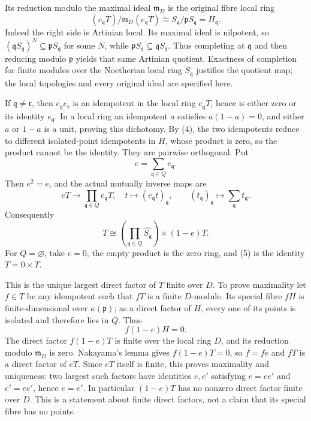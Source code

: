 Its reduction modulo the maximal ideal \(\mathfrak m_D\) is the original fibre local ring \[
 (e_{\mathfrak q}T)/\mathfrak m_D(e_{\mathfrak q}T)
 \cong S_{\mathfrak q}/\mathfrak pS_{\mathfrak q}
 =H_{\bar{\mathfrak q}}.
 \tag{4}
\] Indeed the right side is Artinian local. Its maximal ideal is nilpotent, so \((\mathfrak qS_{\mathfrak q})^N\subseteq\mathfrak pS_{\mathfrak q}\) for some \(N\), while \(\mathfrak pS_{\mathfrak q}\subseteq\mathfrak qS_{\mathfrak q}\). Thus completing at \(\mathfrak q\) and then reducing modulo \(\mathfrak p\) yields that same Artinian quotient. Exactness of completion for finite modules over the Noetherian local ring \(S_{\mathfrak q}\) justifies the quotient map; the local topologies and every original ideal are specified here.

If \(\mathfrak q\ne\mathfrak r\), then \(e_{\mathfrak q}e_{\mathfrak r}\) is an idempotent in the local ring \(e_{\mathfrak q}T\), hence is either zero or its identity \(e_{\mathfrak q}\). In a local ring an idempotent \(a\) satisfies \(a(1-a)=0\), and either \(a\) or \(1-a\) is a unit, proving this dichotomy. By (4), the two idempotents reduce to different isolated-point idempotents in \(H\), whose product is zero, so the product cannot be the identity. They are pairwise orthogonal. Put \[
 e=\sum_{\mathfrak q\in Q}e_{\mathfrak q}.
\] Then \(e^2=e\), and the actual mutually inverse maps are \[
 eT\longrightarrow\prod_{\mathfrak q\in Q}e_{\mathfrak q}T,\quad
 t\longmapsto(e_{\mathfrak q}t)_{\mathfrak q},
 \qquad
 (t_{\mathfrak q})_{\mathfrak q}\longmapsto\sum_{\mathfrak q}t_{\mathfrak q}.
\] Consequently \[
 T\cong
 \left(\prod_{\mathfrak q\in Q}\widehat{S_{\mathfrak q}}\right)
 \times(1-e)T.
 \tag{5}
\] For \(Q=\varnothing\), take \(e=0\), the empty product is the zero ring, and (5) is the identity \(T=0\times T\).

This is the unique largest direct factor of \(T\) finite over \(D\). To prove maximality let \(f\in T\) be any idempotent such that \(fT\) is a finite \(D\)-module. Its special fibre \(fH\) is finite-dimensional over \(\kappa(\mathfrak p)\); as a direct factor of \(H\), every one of its points is isolated and therefore lies in \(Q\). Thus \[
 f(1-e)H=0.
\] The direct factor \(f(1-e)T\) is finite over the local ring \(D\), and its reduction modulo \(\mathfrak m_D\) is zero. Nakayama's lemma gives \(f(1-e)T=0\), so \(f=fe\) and \(fT\) is a direct factor of \(eT\). Since \(eT\) itself is finite, this proves maximality and uniqueness: two largest such factors have identities \(e,e'\) satisfying \(e=ee'\) and \(e'=ee'\), hence \(e=e'\). In particular \((1-e)T\) has no nonzero direct factor finite over \(D\). This is a statement about finite direct factors, not a claim that its special fibre has no points.

